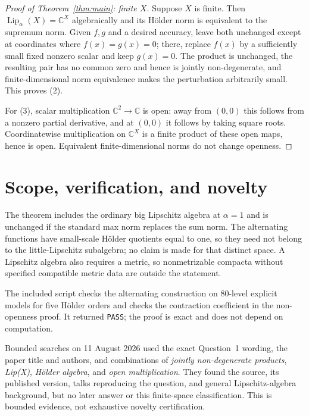 \documentclass[11pt]{article}
\newcommand{\Lip}{\operatorname{Lip}}
\newcommand{\C}{\mathbb C}
\begin{document}
\begin{proof}[Proof of Theorem~\ref{thm:main}: finite $X$]
Suppose $X$ is finite.  Then $\Lip_\alpha(X)=\C^X$ algebraically and its
H\"older norm is equivalent to the supremum norm.  Given $f,g$ and a desired
accuracy, leave both unchanged except at coordinates where $f(x)=g(x)=0$;
there, replace $f(x)$ by a sufficiently small fixed nonzero scalar and keep
$g(x)=0$.  The product is unchanged, the resulting pair has no common zero
and hence is jointly non-degenerate, and finite-dimensional norm equivalence
makes the perturbation arbitrarily small.  This proves (2).

For (3), scalar multiplication $\C^2\to\C$ is open: away from $(0,0)$ this
follows from a nonzero partial derivative, and at $(0,0)$ it follows by taking
square roots.  Coordinatewise multiplication on $\C^X$ is a finite product of
these open maps, hence is open.  Equivalent finite-dimensional norms do not
change openness.
\end{proof}

\section{Scope, verification, and novelty}

The theorem includes the ordinary big Lipschitz algebra at $\alpha=1$ and is
unchanged if the standard max norm replaces the sum norm.  The alternating
functions have small-scale H\"older quotients equal to one, so they need not
belong to the little-Lipschitz subalgebra; no claim is made for that distinct
space.  A Lipschitz algebra also requires a metric, so nonmetrizable compacta
without specified compatible metric data are outside the statement.

The included script checks the alternating construction on 80-level explicit
models for five H\"older orders and checks the contraction coefficient in the
non-openness proof.  It returned \texttt{PASS}; the proof is exact and does not
depend on computation.

Bounded searches on 11 August 2026 used the exact Question~1 wording, the
paper title and authors, and combinations of \emph{jointly non-degenerate
products}, \emph{Lip(X)}, \emph{H\"older algebra}, and \emph{open
multiplication}.  They found the source, its published version, talks
reproducing the question, and general Lipschitz-algebra background, but no
later answer or this finite-space classification.  This is bounded evidence,
not exhaustive novelty certification.
\end{document}
